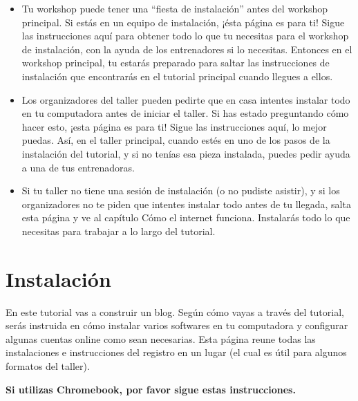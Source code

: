 \documentclass[
  a4paper,
  DIV=11,
  numbers=noendperiod,
  onepage,
  openany]{scrreprt}
\begin{document}
\begin{itemize}
\item
  Tu workshop puede tener una ``fiesta de instalación'' antes del
  workshop principal. Si estás en un equipo de instalación, ¡ésta página
  es para ti! Sigue las instrucciones aquí para obtener todo lo que tu
  necesitas para el workshop de instalación, con la ayuda de los
  entrenadores si lo necesitas. Entonces en el workshop principal, tu
  estarás preparado para saltar las instrucciones de instalación que
  encontrarás en el tutorial principal cuando llegues a ellos.
\item
  Los organizadores del taller pueden pedirte que en casa intentes
  instalar todo en tu computadora antes de iniciar el taller. Si has
  estado preguntando cómo hacer esto, ¡esta página es para ti! Sigue las
  instrucciones aquí, lo mejor puedas. Así, en el taller principal,
  cuando estés en uno de los pasos de la instalación del tutorial, y si
  no tenías esa pieza instalada, puedes pedir ayuda a una de tus
  entrenadoras.
\item
  Si tu taller no tiene una sesión de instalación (o no pudiste
  asistir), y si los organizadores no te piden que intentes instalar
  todo antes de tu llegada, salta esta página y ve al capítulo Cómo el
  internet funciona. Instalarás todo lo que necesitas para trabajar a lo
  largo del tutorial.
\end{itemize}

\chapter{Instalación}\label{instalaciuxf3n-1}

En este tutorial vas a construir un blog. Según cómo vayas a través del
tutorial, serás instruida en cómo instalar varios softwares en tu
computadora y configurar algunas cuentas online como sean necesarias.
Esta página reune todas las instalaciones e instrucciones del registro
en un lugar (el cual es útil para algunos formatos del taller).

\textbf{Si utilizas Chromebook, por favor sigue estas instrucciones.}
\end{document}
